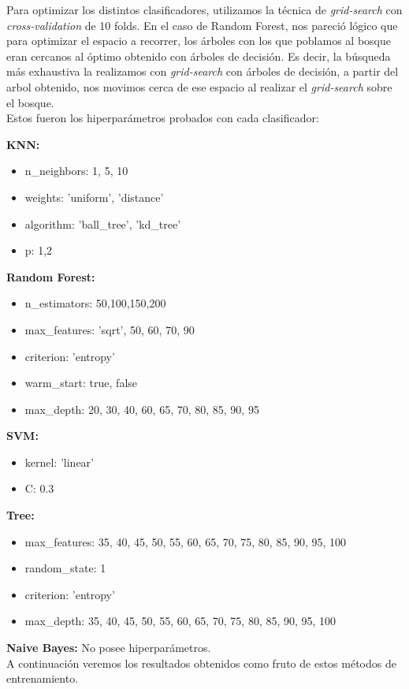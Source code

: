 Para optimizar los distintos clasificadores, utilizamos la técnica de \textit{grid-search} con \textit{cross-validation} de 10 folds. En el caso de Random Forest, nos pareció lógico que para optimizar el espacio a recorrer, los árboles con los que poblamos al bosque eran cercanos al óptimo obtenido con árboles de decisión. Es decir, la búsqueda más exhaustiva la realizamos con \textit{grid-search} con árboles de decisión, a partir del arbol obtenido, nos movimos cerca de ese espacio al realizar el \textit{grid-search} sobre el bosque.
\\

Estos fueron los hiperparámetros probados con cada clasificador: \\

\medskip

\textbf{KNN:}
\begin{itemize}
	\item n\_neighbors: 1, 5, 10
	\item weights: 'uniform', 'distance'
	\item algorithm: 'ball\_tree', 'kd\_tree'
	\item p: 1,2
\end{itemize}

\smallskip

\textbf{Random Forest:}
\begin{itemize}
	\item n\_estimators: 50,100,150,200
	\item max\_features: 'sqrt', 50, 60, 70, 90
	\item criterion: 'entropy'
	\item warm\_start: true, false
	\item max\_depth: 20, 30, 40, 60, 65, 70, 80, 85, 90, 95
\end{itemize}

\smallskip

\textbf{SVM:}
\begin{itemize}
	\item kernel: 'linear'
	\item C: 0.3
\end{itemize}

\smallskip

\textbf{Tree:}
\begin{itemize}
	\item max\_features: 35, 40, 45, 50, 55, 60, 65, 70, 75, 80, 85, 90, 95, 100
	\item random\_state: 1
 	\item criterion: 'entropy'
 	\item max\_depth: 35, 40, 45, 50, 55, 60, 65, 70, 75, 80, 85, 90, 95, 100
\end{itemize}

\smallskip


\textbf{Naive Bayes:} 
No posee hiperparámetros. \\

A continuación veremos los resultados obtenidos como fruto de estos métodos de entrenamiento.
